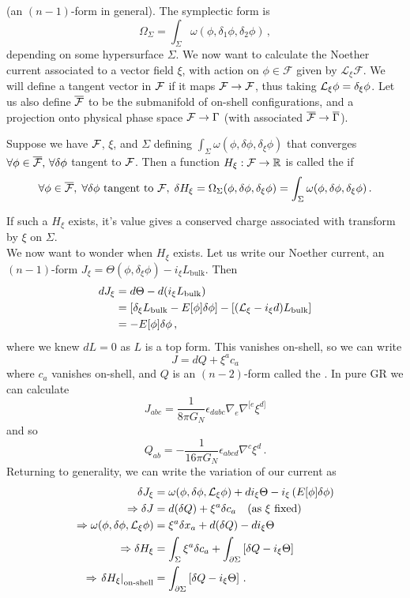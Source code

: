 \documentclass{article}
\begin{document}
(an $(n-1)$-form in general). The symplectic form is 
\[
\Omega_\Sigma = \int_\Sigma \omega (\phi, \delta_1 \phi, \delta_2 \phi) \, ,
\] 
depending on some hypersurface $\Sigma$. We now want to calculate the Noether current associated to a vector field $\xi$, with action on $\phi \in \mathcal{F}$ given by $\mathcal{L}_\xi \mathcal{F}$. We will define a tangent vector in $\mathcal{F}$ if it maps $\mathcal{F} \to \mathcal{F}$, thus taking $\mathcal{L}_\xi \phi = \delta_\xi \phi$. Let us also define $\overline{\mathcal{F}}$ to be the submanifold of on-shell configurations, and a projection onto physical phase space $\mathcal{F} \to \Gamma$ (with associated $\overline{\mathcal{F}} \to \overline{\Gamma}$).

\begin{definition}
	Suppose we have $\mathcal{F}$, $\xi$, and $\Sigma$ defining $\int_\Sigma \omega(\phi, \delta \phi , \delta_\xi \phi)$ that converges $\forall \phi \in \overline{\mathcal{F}}, \, \forall \delta \phi$ tangent to $\mathcal{F}$. Then a function $H_\xi : \mathcal{F} \to \mathbb{R}$ is called the  if 
	\[
	\forall \phi \in \overline{\mathcal{F}}, \; \forall \delta \phi \text{ tangent to }\mathcal{F}, \; \delta H_ \xi = \Omega_\Sigma(\phi, \delta \phi, \delta_\xi \phi) = \int_\Sigma \omega(\phi, \delta \phi, \delta_\xi \phi) \, . 
	\]
\end{definition}
If such a $H_\xi$ exists, it's value gives a conserved charge associated with transform by $\xi$ on $\Sigma$. \\
We now want to wonder when $H_\xi$ exists. Let us write our Noether current, an $(n-1)$-form $J_\xi = \Theta(\phi, \delta_\xi \phi) - i_\xi L_{\text{bulk}}$. Then 
\begin{align*}
	dJ_\xi &= d\Theta - d(i_\xi L_{\text{bulk}}) \\
	&= \left[ \delta_\xi L_{\text{bulk}} - E[\phi] \delta \phi \right] - \left[ (\mathcal{L}_\xi - i_\xi d) L_{\text{bulk}} \right] \\
	&= - E[\phi] \delta \phi \, , 
\end{align*}
where we knew $dL=0$ as $L$ is a top form. This vanishes on-shell, so we can write 
\[
J = dQ + \xi^a c_a
\]
where $c_a$ vanishes on-shell, and $Q$ is an $(n-2)$-form called the . In pure GR we can calculate 
\[
J_{abc} = \frac{1}{8 \pi G_N} \epsilon_{dabc} \nabla_e \nabla^{[e} \xi^{d]}
\]
and so 
\[
Q_{ab} = -\frac{1}{16 \pi G_N} \epsilon_{abcd} \nabla^c \xi^d \, . 
\]
Returning to generality, we can write the variation of our current as 
\begin{align*}
	\delta J_\xi &= \omega(\phi, \delta \phi, \mathcal{L}_\xi \phi) + di_\xi \Theta - i_\xi \left( E[\phi]\delta \phi \right) \\
	\Rightarrow \delta J &= d(\delta Q) + \xi^a \delta c_a \quad (\text{as $\xi$ fixed}) \\
	\Rightarrow \omega(\phi, \delta \phi, \mathcal{L}_\xi \phi) &= \xi^a \delta x_a + d(\delta Q) - di_\xi \Theta \\
	\Rightarrow \delta H_\xi &= \int_\Sigma \xi^a \delta c_a + \int_{\partial \Sigma} \left[ \delta Q - i_\xi \Theta \right] \\
	\Rightarrow \left. \delta H_\xi \right\rvert_{\text{on-shell}} &= \int_{\partial \Sigma} \left[ \delta Q - i_\xi \Theta \right] \, .
\end{align*}
\end{document}
